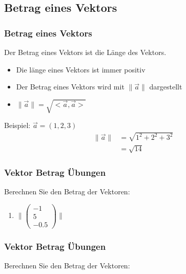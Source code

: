 \subsection{Betrag eines Vektors}
\begin{frame}
    \frametitle{Betrag eines Vektors}
    Der Betrag eines Vektors ist die Länge des Vektors.
    \begin{itemize}
        \item Die länge eines Vektors ist immer positiv
        \item Der Betrag eines Vektors wird mit $\lVert \vec{a} \rVert$ dargestellt
        \item $\lVert \vec{a} \rVert = \sqrt{<\vec{a}, \vec{a}>}$
    \end{itemize}
    Beispiel: $\vec{a} = (1,2,3)$
    \begin{align*}
        \lVert \vec{a} \rVert &= \sqrt{1^2 + 2^2 + 3^2} \\
        &= \sqrt{14}
    \end{align*}
\end{frame}

\begin{frame}
    \frametitle{Vektor Betrag Übungen}
    Berechnen Sie den Betrag der Vektoren:
    \begin{enumerate}
        \item $\lVert \begin{pmatrix}
                          -1 \\ 5 \\ -0.5
        \end{pmatrix} \rVert$
    \end{enumerate}
\end{frame}

\begin{frame}
    \frametitle{Vektor Betrag Übungen}
    Berechnen Sie den Betrag der Vektoren:
\end{frame}

